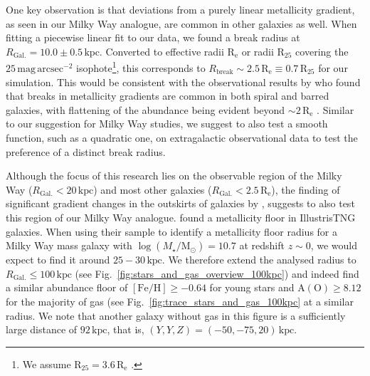 \documentclass[twocolumn,apj,numberedappendix,appendixfloats,twocolappendix]{openjournal}
\begin{document}
\begin{CJK*}{UTF8}{gbsn}
One key observation is that deviations from a purely linear metallicity gradient, as seen in our Milky Way analogue, are common in other galaxies as well. When fitting a piecewise linear fit to our data, we found a break radius at $R_\mathrm{Gal.} = 10.0 \pm 0.5\,\mathrm{kpc}$. Converted to effective radii $\mathrm{R_e}$ or radii $\mathrm{R_{25}}$ covering the $25\,\mathrm{mag\,arcsec^{-2}}$ isophote\footnote{We assume $\mathrm{R_{25}} = 3.6\,\mathrm{R_e}$ \citep{Williams2009, Chen2023}.}, this corresponds to $R_\mathrm{break} \sim 2.5\,\mathrm{R_e} \equiv 0.7\,\mathrm{R_{25}}$ for our simulation. This would be consistent with the observational results by \citet{Sanchez2014} who found that breaks in metallicity gradients are common in both spiral and barred galaxies, with flattening of the abundance being evident beyond $\sim 2\,\mathrm{R_e}$ \citep[compare also to][]{Belfiore2017}. Similar to our suggestion for Milky Way studies, we suggest to also test a smooth function, such as a quadratic one, on extragalactic observational data \citep[e.g.][]{Bresolin2012, Chen2023} to test the preference of a distinct break radius.

Although the focus of this research lies on the observable region of the Milky Way ($R_\mathrm{Gal.} < 20\,\mathrm{kpc}$) and most other galaxies ($R_\mathrm{Gal.} < 2.5\,\mathrm{R_e}$), the finding of significant gradient changes in the outskirts of galaxies by \citet{Garcia2023}, suggests to also test this region of our Milky Way analogue. \citet[][see their Fig.~4]{Garcia2023} found a metallicity floor in IllustrisTNG galaxies. When using their sample to identify a metallicity floor radius for a Milky Way mass galaxy with $\log(M_\star/\mathrm{M_\odot}) = 10.7$ \citep{BlandHawthorn_Gerhard2016} at redshift $z \sim 0$, we would expect to find it around $25-30\,\mathrm{kpc}$. We therefore extend the analysed radius to $R_\mathrm{Gal.} \leq 100\,\mathrm{kpc}$ (see Fig.~\ref{fig:stars_and_gas_overview_100kpc}) and indeed find a similar abundance floor of $\mathrm{[Fe/H]} \geq -0.64$ for young stars and $\mathrm{A(O)} \geq 8.12$ for the majority of gas (see Fig.~\ref{fig:trace_stars_and_gas_100kpc} at a similar radius. We note that another galaxy without gas in this figure is a sufficiently large distance of $92\,\mathrm{kpc}$, that is, $(Y,Y,Z) = (-50,-75,20)\,\mathrm{kpc}$.


\end{CJK*}
\end{document}
